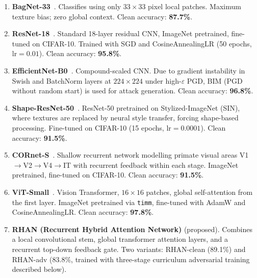 \documentclass[12pt,a4paper]{article}
\begin{document}
\begin{enumerate}[leftmargin=1.5em]

  \item \textbf{BagNet-33}~\citep{brendel2019approximating}.
        Classifies using only $33{\times}33$ pixel local patches.
        Maximum texture bias; zero global context.
        Clean accuracy: \textbf{87.7\%}.

  \item \textbf{ResNet-18}~\citep{he2016deep}.
        Standard 18-layer residual CNN, ImageNet pretrained, fine-tuned on
        CIFAR-10. Trained with SGD and CosineAnnealingLR (50 epochs,
        $\text{lr}{=}0.01$).
        Clean accuracy: \textbf{95.8\%}.

  \item \textbf{EfficientNet-B0}~\citep{tan2019efficientnet}.
        Compound-scaled CNN. Due to gradient instability in Swish and
        BatchNorm layers at $224{\times}224$ under high-$\varepsilon$ PGD,
        BIM (PGD without random start) is used for attack generation.
        Clean accuracy: \textbf{96.8\%}.

  \item \textbf{Shape-ResNet-50}~\citep{geirhos2019imagenet}.
        ResNet-50 pretrained on Stylized-ImageNet (SIN), where textures are
        replaced by neural style transfer, forcing shape-based processing.
        Fine-tuned on CIFAR-10 (15 epochs, $\text{lr}{=}0.0001$).
        Clean accuracy: \textbf{91.5\%}.

  \item \textbf{CORnet-S}~\citep{kubilius2019brain}.
        Shallow recurrent network modelling primate visual areas
        V1$\!\to$V2$\!\to$V4$\!\to$IT with recurrent feedback within each
        stage. ImageNet pretrained, fine-tuned on CIFAR-10.
        Clean accuracy: \textbf{91.5\%}.

  \item \textbf{ViT-Small}~\citep{dosovitskiy2020image}.
        Vision Transformer, $16{\times}16$ patches, global self-attention from
        the first layer. ImageNet pretrained via \texttt{timm}, fine-tuned with
        AdamW and CosineAnnealingLR.
        Clean accuracy: \textbf{97.8\%}.

  \item \textbf{RHAN (Recurrent Hybrid Attention Network)} (proposed).
        Combines a local convolutional stem, global transformer attention
        layers, and a recurrent top-down feedback gate.
        Two variants: RHAN-clean (89.1\%) and RHAN-adv (83.8\%, trained
        with three-stage curriculum adversarial training described below).

\end{enumerate}
\end{document}

